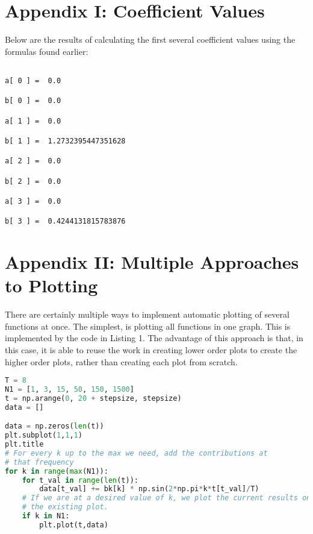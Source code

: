 \documentclass[12pt]{report}
\begin{document}
\hypertarget{appendix-i-coefficient-values}{%
\chapter{Appendix I: Coefficient
Values}\label{appendix-i-coefficient-values}}

Below are the results of calculating the first several coefficient
values using the formulas found earlier:

    \begin{Verbatim}[commandchars=\\\{\}]

a[ 0 ] =  0.0

b[ 0 ] =  0.0

a[ 1 ] =  0.0

b[ 1 ] =  1.2732395447351628

a[ 2 ] =  0.0

b[ 2 ] =  0.0

a[ 3 ] =  0.0

b[ 3 ] =  0.4244131815783876

    \end{Verbatim}

\hypertarget{appendix-ii-multiple-approaches-to-plotting}{%
\chapter{Appendix II: Multiple Approaches to
Plotting}\label{appendix-ii-multiple-approaches-to-plotting}}

There are certainly multiple ways to implement automatic plotting of
several functions at once. The simplest, is plotting all functions in
one graph. This is implemented by the code in Listing 1. The advantage
of this approach is that, in this case, it is able to reuse the work in
creating lower order plots to create the higher order plots, rather than
creating each plot from scratch.

\begin{lstlisting}[language=Python, caption=Python implementation to generate a graph with all the plots on one axis.]
T = 8
N1 = [1, 3, 15, 50, 150, 1500]
t = np.arange(0, 20 + stepsize, stepsize)
data = []

data = np.zeros(len(t))
plt.subplot(1,1,1)
plt.title
# For every k up to the max we need, add the contributions at 
# that frequency
for k in range(max(N1)):
    for t_val in range(len(t)):
        data[t_val] += bk[k] * np.sin(2*np.pi*k*t[t_val]/T)
    # If we are at a desired value of k, we plot the current results on 
    # the existing plot.
    if k in N1:
        plt.plot(t,data)

\end{lstlisting}
\end{document}
